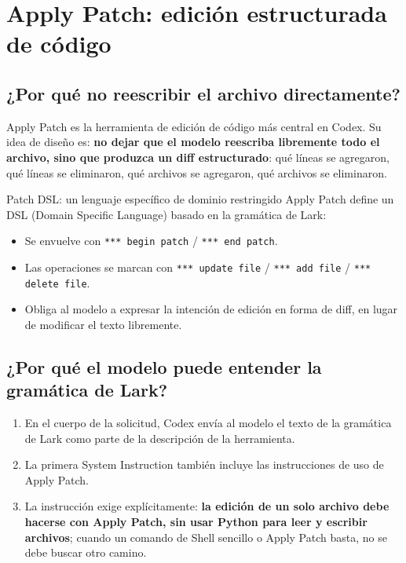 \section{Apply Patch: edición estructurada de código}

\subsection{¿Por qué no reescribir el archivo directamente?}

Apply Patch es la herramienta de edición de código más central en Codex. Su idea de diseño es: \textbf{no dejar que el modelo reescriba libremente todo el archivo, sino que produzca un diff estructurado}: qué líneas se agregaron, qué líneas se eliminaron, qué archivos se agregaron, qué archivos se eliminaron.

\begin{importantbox}{Patch DSL: un lenguaje específico de dominio restringido}
Apply Patch define un DSL (Domain Specific Language) basado en la gramática de Lark:
\begin{itemize}
    \item Se envuelve con \texttt{*** begin patch} / \texttt{*** end patch}.
    \item Las operaciones se marcan con \texttt{*** update file} / \texttt{*** add file} / \texttt{*** delete file}.
    \item Obliga al modelo a expresar la intención de edición en forma de diff, en lugar de modificar el texto libremente.
\end{itemize}
\end{importantbox}

\subsection{¿Por qué el modelo puede entender la gramática de Lark?}

\begin{enumerate}
    \item En el cuerpo de la solicitud, Codex envía al modelo el texto de la gramática de Lark como parte de la descripción de la herramienta.
    \item La primera System Instruction también incluye las instrucciones de uso de Apply Patch.
    \item La instrucción exige explícitamente: \textbf{la edición de un solo archivo debe hacerse con Apply Patch, sin usar Python para leer y escribir archivos}; cuando un comando de Shell sencillo o Apply Patch basta, no se debe buscar otro camino.
\end{enumerate}

